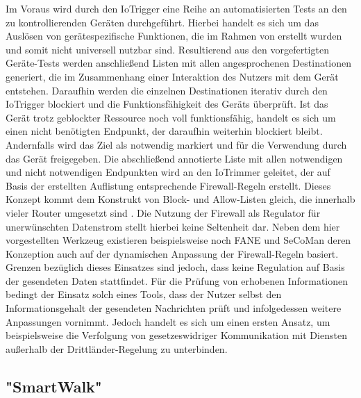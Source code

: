 \noindent Im Voraus wird durch den IoTrigger eine Reihe an automatisierten Tests an den zu kontrollierenden Geräten durchgeführt. Hierbei handelt es sich um das Auslösen von gerätespezifische Funktionen, die im Rahmen von \cite[p. 13-14]{Mandalari2021} erstellt wurden und somit nicht universell nutzbar sind. 
Resultierend aus den vorgefertigten Geräte-Tests werden anschließend Listen mit allen angesprochenen Destinationen generiert, die im Zusammenhang einer Interaktion des Nutzers mit dem Gerät entstehen. Daraufhin werden die einzelnen Destinationen iterativ durch den IoTrigger blockiert und die Funktionsfähigkeit des Geräts überprüft. 
Ist das Gerät trotz geblockter Ressource noch voll funktionsfähig, handelt es sich um einen nicht benötigten Endpunkt, der daraufhin weiterhin blockiert bleibt. Andernfalls wird das Ziel als notwendig markiert und für die Verwendung durch das Gerät freigegeben. 
Die abschließend annotierte Liste mit allen notwendigen und nicht notwendigen Endpunkten wird an den IoTrimmer geleitet, der auf Basis der erstellten Auflistung entsprechende Firewall-Regeln erstellt. Dieses Konzept kommt dem Konstrukt von Block- und Allow-Listen gleich, die innerhalb vieler Router umgesetzt sind \cite{FritzBox2022}.
Die Nutzung der Firewall als Regulator für unerwünschten Datenstrom stellt hierbei keine Seltenheit dar. Neben dem hier vorgestellten Werkzeug existieren beispielsweise noch FANE \cite{Haar2019} und SeCoMan \cite{Huertas2016} deren Konzeption auch auf der dynamischen Anpassung der Firewall-Regeln basiert. Grenzen bezüglich dieses Einsatzes sind jedoch, dass keine Regulation auf Basis der gesendeten Daten stattfindet. 
Für die Prüfung von erhobenen Informationen bedingt der Einsatz solch eines Tools, dass der Nutzer selbst den Informationsgehalt der gesendeten Nachrichten prüft und infolgedessen weitere Anpassungen vornimmt. Jedoch handelt es sich um einen ersten Ansatz, um beispielsweise die Verfolgung von gesetzeswidriger Kommunikation mit Diensten außerhalb der Drittländer-Regelung \cite{Dsgvo2016} zu unterbinden.

\subsection{"SmartWalk" \cite{Natix2022}}
\label{sec:Regulationsmöglichkeiten:ssec:SmartWalk}

